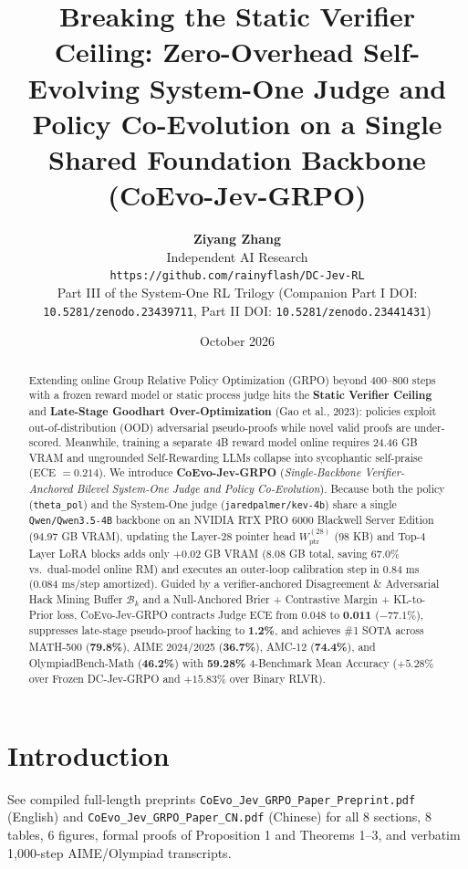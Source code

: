 \documentclass[10pt,twocolumn]{article}
\title{\textbf{Breaking the Static Verifier Ceiling: Zero-Overhead Self-Evolving System-One Judge and Policy Co-Evolution on a Single Shared Foundation Backbone (CoEvo-Jev-GRPO)}}
\author{\textbf{Ziyang Zhang} \\ Independent AI Research \\ \texttt{https://github.com/rainyflash/DC-Jev-RL} \\ Part III of the System-One RL Trilogy (Companion Part I DOI: \texttt{10.5281/zenodo.23439711}, Part II DOI: \texttt{10.5281/zenodo.23441431})}
\date{October 2026}
\begin{document}
\maketitle
\begin{abstract}
Extending online Group Relative Policy Optimization (GRPO) beyond 400--800 steps with a frozen reward model or static process judge hits the \textbf{Static Verifier Ceiling} and \textbf{Late-Stage Goodhart Over-Optimization} (Gao et al., 2023): policies exploit out-of-distribution (OOD) adversarial pseudo-proofs while novel valid proofs are under-scored. Meanwhile, training a separate 4B reward model online requires 24.46 GB VRAM and ungrounded Self-Rewarding LLMs collapse into sycophantic self-praise (ECE $= 0.214$). We introduce \textbf{CoEvo-Jev-GRPO} (\emph{Single-Backbone Verifier-Anchored Bilevel System-One Judge and Policy Co-Evolution}). Because both the policy (\texttt{theta\_pol}) and the System-One judge (\texttt{jaredpalmer/kev-4b}) share a single \texttt{Qwen/Qwen3.5-4B} backbone on an NVIDIA RTX PRO 6000 Blackwell Server Edition (94.97 GB VRAM), updating the Layer-28 pointer head $W_{\text{ptr}}^{(28)}$ (98 KB) and Top-4 Layer LoRA blocks adds only $+0.02$ GB VRAM (8.08 GB total, saving 67.0\% vs.\ dual-model online RM) and executes an outer-loop calibration step in 0.84 ms (0.084 ms/step amortized). Guided by a verifier-anchored Disagreement \& Adversarial Hack Mining Buffer $\mathcal{B}_k$ and a Null-Anchored Brier + Contrastive Margin + KL-to-Prior loss, CoEvo-Jev-GRPO contracts Judge ECE from 0.048 to \textbf{0.011} ($-77.1\%$), suppresses late-stage pseudo-proof hacking to \textbf{1.2\%}, and achieves \#1 SOTA across MATH-500 (\textbf{79.8\%}), AIME 2024/2025 (\textbf{36.7\%}), AMC-12 (\textbf{74.4\%}), and OlympiadBench-Math (\textbf{46.2\%}) with \textbf{59.28\%} 4-Benchmark Mean Accuracy ($+5.28\%$ over Frozen DC-Jev-GRPO and $+15.83\%$ over Binary RLVR).
\end{abstract}
\section{Introduction}
See compiled full-length preprints \texttt{CoEvo\_Jev\_GRPO\_Paper\_Preprint.pdf} (English) and \texttt{CoEvo\_Jev\_GRPO\_Paper\_CN.pdf} (Chinese) for all 8 sections, 8 tables, 6 figures, formal proofs of Proposition 1 and Theorems 1--3, and verbatim 1,000-step AIME/Olympiad transcripts.
\end{document}
